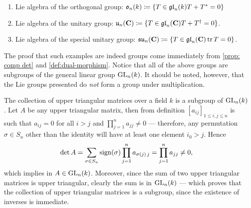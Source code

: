 \begin{example}
\begin{enumerate}
        \item Lie algebra of the orthogonal group: \(\mathfrak{o}_n(k) \coloneq \{ T \in
              \mathfrak{gl}_n(k) \relax T + T^{*} = 0\}\)

        \item Lie algebra of the unitary group: \(\mathfrak{u}_n(\mathbf{C}) \coloneq \{T \in
              \mathfrak{gl}_n(\mathbf{C}) \relax T + T^{\dag} = 0\}\).

        \item Lie algebra of the special unitary group: \(\mathfrak{su}_n(\mathbf{C}) \coloneq \{T
              \in \mathfrak{gl}_n(\mathbf{C}) \relax \operatorname{tr} T = 0\}\).
    \end{enumerate}
    The proof that such examples are indeed groups come immediately from \cref{prop:
        comp det} and \cref{def:dual-morphism}. Notice that all of the above groups are
    subgroups of the general linear group \(\operatorname{GL}_n(k)\). It should be noted, however,
    that the Lie groups presented do \emph{not} form a group under multiplication.
\end{example}

\begin{example}
    \label{exp:upper-triangular-GL-subgroup}
    The collection of upper triangular matrices over a field \(k\) is a subgroup of
    \(\operatorname{GL}_n(k)\). Let \(A\) be any upper triangular matrix, then from definition
    \([a_{ij}]_{1 \leq i, j \leq n}\) is such that \(a_{ij} = 0\) for all \(i > j\)
    and \(\prod_{j=1}^n a_{jj} \neq 0\) --- therefore, any permutation \(\sigma \in
    S_n\) other than the identity will have at least one element \(i_0 > j\). Hence
    \[
        \det A = \sum_{\sigma \in S_n} \operatorname{sign}(\sigma) \prod_{j=1}^n a_{\sigma(j)\, j}
        = \prod_{j=1}^n a_{j j}
        \neq 0,
    \]
    which implies in \(A \in \operatorname{GL}_n(k)\). Moreover, since the sum of two upper
    triangular matrices is upper triangular, clearly the sum is in \(\operatorname{GL}_n(k)\) ---
    which proves that the collection of upper triangular matrices is a subgroup,
    since the existence of inverses is immediate.
\end{example}

